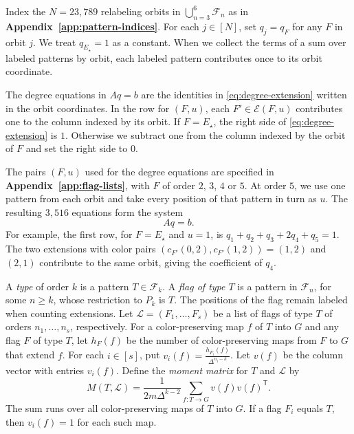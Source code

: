 Index the $N=23{,}789$ relabeling orbits in
$\bigcup_{n=3}^6\mathcal F_n$ as in \textbf{Appendix~\ref{app:pattern-indices}}.
For each $j\in[N]$, set $q_j=q_F$ for any $F$ in orbit $j$.
We treat $q_{E_\star}=1$ as a constant. When we collect the terms of a
sum over labeled patterns by orbit, each labeled pattern contributes
once to its orbit coordinate.

The degree equations in $Aq=b$ are the identities in
\eqref{eq:degree-extension} written in the orbit coordinates.
In the row for $(F,u)$, each $F'\in\mathcal E(F,u)$ contributes
one to the column indexed by its orbit. If $F=E_\star$, the right
side of \eqref{eq:degree-extension} is $1$. Otherwise we subtract
one from the column indexed by the orbit of $F$ and set the right
side to $0$.

The pairs $(F,u)$ used for the degree equations are specified
in \textbf{Appendix~\ref{app:flag-lists}}, with $F$ of order $2$, $3$,
$4$ or $5$. At order $5$, we use one pattern from each orbit and
take every position of that pattern in turn as $u$. The resulting
$3{,}516$ equations form the system
\begin{equation}\label{eq:linear-system}
 Aq=b.
\end{equation}
For example, the first row, for $F=E_\star$ and $u=1$, is
$q_1+q_2+q_3+2q_4+q_5=1$. The two extensions with color pairs
$(c_{F'}(0,2),c_{F'}(1,2))=(1,2)$ and $(2,1)$ contribute to
the same orbit, giving the coefficient of $q_4$.

A \emph{type} of order $k$ is a pattern $T\in\mathcal F_k$.
A \emph{flag of type $T$} is a pattern in $\mathcal F_n$, for some
$n\geq k$, whose restriction to $P_k$ is $T$. The positions of the
flag remain labeled when counting extensions. Let
$\mathcal L=(F_1,\ldots,F_s)$ be a list of flags of type $T$ of
orders $n_1,\ldots,n_s$, respectively. For a color-preserving map
$f$ of $T$ into $G$ and any flag $F$ of type $T$, let $h_F(f)$ be
the number of color-preserving maps from $F$ to $G$ that extend
$f$. For each $i\in[s]$, put $v_i(f)=\frac{h_{F_i}(f)}{\Delta^{n_i-k}}$.
Let $v(f)$ be the column vector with entries $v_i(f)$. Define the
\emph{moment matrix} for $T$ and $\mathcal L$ by
\begin{equation}\label{eq:moment-definition}
 M(T,\mathcal L)=\frac{1}{2m\Delta^{k-2}}
       \sum_{f:T\to G}v(f)v(f)^{\mathsf T}.
\end{equation}
The sum runs over all color-preserving maps of $T$ into $G$. If a
flag $F_i$ equals $T$, then $v_i(f)=1$ for each such map.


